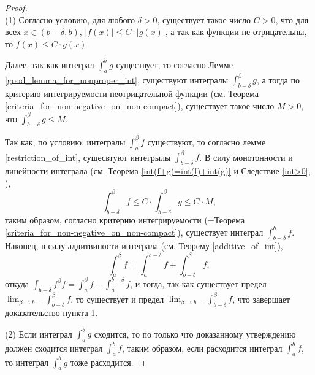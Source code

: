 \begin{proof}~\\
(1) Согласно условию, для любого $\delta>0$, существует такое число $C>0$, что для всех $x \in (b- \delta, b)$, $|f(x)| \le C \cdot |g(x)|$, а так как функции не отрицательны, то $f(x) \le C \cdot g(x).$

Далее, так как интеграл $\int_a^b g$ существует, то согласно Лемме \ref{good_lemma_for_nonproper_int}, существуют интегралы $\int_{b-\delta}^\beta g$, а тогда по критерию интегрируемости неотрицательной функции (см. Теорема \ref{criteria_for_non-negative_on_non-compact}), существует такое число $M>0$, что $\int_{b-\delta}^\beta g \le M.$

Так как, по условию, интегралы $\int_a^\beta f$ существуют, то согласно лемме \ref{restriction_of_int}, сущесвтуют интегрылы $\int_{b-\delta}^\beta f$. В силу монотонности и линейности интеграла (см. Теорема \ref{int(f+g)=int(f)+int(g)} и Следствие \ref{int>0}, ), 
\[
 \int_{b-\delta}^\beta f \le C \cdot \int_{b-\delta}^\beta g \le C\cdot M,
\]
таким образом, согласно критерию интегрируемости (=Теорема \ref{criteria_for_non-negative_on_non-compact}), существует интеграл $\int_{b-\delta}^b f$. Наконец, в силу аддитвиности интеграла (см. Теорему \ref{additive_of_int}), 
\[
 \int_a^\beta f = \int_a^{b-\delta} f + \int_{b-\delta}^\beta f,
\]
откуда $\int_{b-\delta}f^\beta f = \int_a^\beta f - \int_a^{b-\delta}f$, и тогда, так как существует предел $\lim_{\beta \to b-} \int_{b-\delta}^\beta f$, то существует и предел $\lim_{\beta \to b-}\int_{b-\delta}^\beta f$, что завершает доказательство пункта 1.

(2) Если интеграл $\int_a^b g$ сходится, то по только что доказанному утверждению должен сходится интеграл $\int_a^b f$, таким образом, если расходится интеграл $\int_a^b f$, то интеграл $\int_a^b g$ тоже расходится.
\end{proof}


